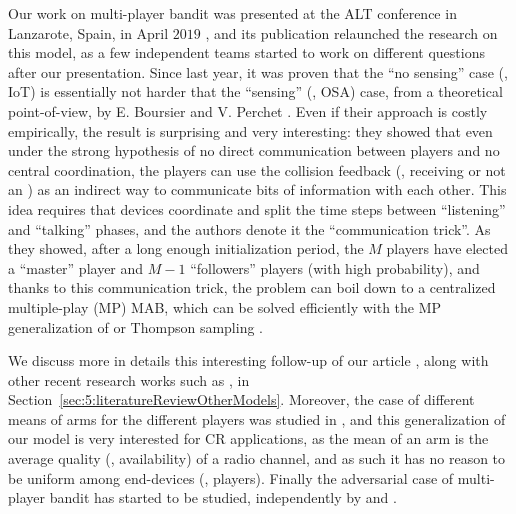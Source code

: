 Our work on multi-player bandit was presented at the ALT conference in Lanzarote, Spain, in April $2019$ \cite{Besson2018ALT},
%
and its publication relaunched the research on this model, as a few independent teams started to work on different questions after our presentation.
%
Since last year, it was proven that the ``no sensing'' case (\ie, IoT) is essentially not harder that the ``sensing'' (\ie, OSA) case, from a theoretical point-of-view, by E. Boursier and V. Perchet \cite{BoursierPerchet18}.
Even if their approach is costly empirically, the result is surprising and very interesting: they showed that even under the strong hypothesis of no direct communication between players and no central coordination, the players can use the collision feedback (\ie, receiving or not an \Ack) as an indirect way to communicate bits of information with each other.
This idea requires that devices coordinate and split the time steps between ``listening'' and ``talking'' phases, and the authors denote it the ``communication trick''. As they showed, after a long enough initialization period, the $M$ players have elected a ``master'' player and $M-1$ ``followers'' players (with high probability), and thanks to this communication trick, the problem can boil down to a centralized multiple-play (MP) MAB, which can be solved efficiently with the MP generalization of \klUCB{} \cite{Luedtke16} or Thompson sampling \cite{Komiyama15}.

We discuss more in details this interesting follow-up of our article \cite{BoursierPerchet18}, along with other recent research works such as \cite{LugosiMehrabian18}, in Section~\ref{sec:5:literatureReviewOtherModels}.
%
Moreover, the case of different means of arms for the different players was studied in \cite{Bistritz18,KaufmannAbbas19}, and this generalization of our model is very interested for CR applications, as the mean of an arm is the average quality (\eg, availability) of a radio channel, and as such it has no reason to be uniform among end-devices (\ie, players).
%
Finally the adversarial case of multi-player bandit has started to be studied, independently by \cite{bande2019adversarial} and \cite{AlaturLevyKrause19}.


